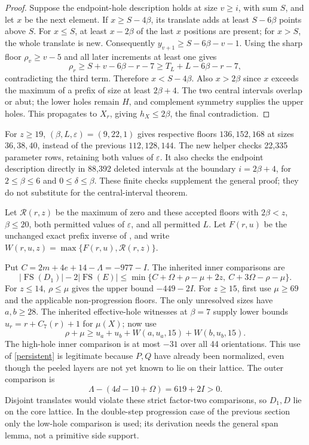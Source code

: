 \documentclass[11pt,a4paper]{article}
\newcommand{\FS}{\operatorname{FS}}
\begin{document}
\begin{proof}
Suppose the endpoint-hole description holds at size $v\ge i$, with
sum $S$, and let $x$ be the next element. If $x\ge S-4\beta$,
its translate adds at least $S-6\beta$ points above $S$.
For $x\le S$, at least $x-2\beta$ of the last $x$ positions are
present; for $x>S$, the whole translate is new. Consequently
$y_{v+1}\ge S-6\beta-v-1$. Using the sharp floor
$\rho_v\ge v-5$ and all later increments at least one gives
\[
 \rho_r\ge S+v-6\beta-r-7\ge T_L+L-6\beta-r-7,
\]
contradicting the third term. Therefore $x<S-4\beta$.
Also $x>2\beta$ since $x$ exceeds the maximum of a prefix of size
at least $2\beta+4$. The two central intervals overlap or abut;
the lower holes remain $H$, and complement symmetry supplies the upper
holes. This propagates to $X_r$, giving $h_X\le2\beta$, the final
contradiction.
\end{proof}
For $z\ge19$, $(\beta,L,\varepsilon)=(9,22,1)$ gives respective
floors $136,152,168$ at sizes $36,38,40$, instead of the previous
$112,128,144$. The new helper 
checks 22,335 parameter rows, retaining both values of $\varepsilon$.
It also checks the endpoint description directly in 88,392 deleted
intervals at the boundary $i=2\beta+4$, for $2\le\beta\le6$ and
$0\le\delta\le\beta$. These finite checks supplement the general
proof; they do not substitute for the central-interval theorem.

Let $\mathcal R(r,z)$ be the maximum of zero and these accepted floors
with $2\beta<z$, $\beta\le20$, both permitted values of
$\varepsilon$, and all permitted $L$. Let $F(r,u)$ be the unchanged exact
prefix inverse of \cite{prefix}, and write
$W(r,u,z)=\max\{F(r,u),\mathcal R(r,z)\}$.

Put $C=2m+4e+14-\Lambda=-977-I$. The inherited inner comparisons are
\[
 |\FS(D_1)|-2|\FS(E)|\le
 \min\{C+\Omega+\rho-\mu+2z,\ C+3\Omega-\rho-\mu\}.
\]
For $z\le14$, $\rho\le\mu$ gives the upper bound $-449-2I$.
For $z\ge15$, first use $\mu\ge69$ and the applicable non-progression
floors. The only unresolved sizes have $a,b\ge28$.
The inherited effective-hole witnesses at $\beta=7$ supply lower
bounds $u_r=r+C_7(r)+1$ for $\mu(X)$; now use
\[
 \rho+\mu\ge u_a+u_b+W(a,u_a,15)+W(b,u_b,15).
\]
The high-hole inner comparison is at most $-31$ over all 44 orientations.
This use of \eqref{persistent} is legitimate because $P,Q$ have already
been normalized, even though the peeled layers are not yet known to
lie on their lattice. The outer comparison is
\[
 \Lambda-(4d-10+\Omega)=619+2I>0.
\]
Disjoint translates would violate these strict factor-two comparisons,
so $D_1,D$ lie on the core lattice. In the double-step progression case
of the previous section only the low-hole comparison is used; its
derivation needs the general span lemma, not a primitive side support.
\end{document}

